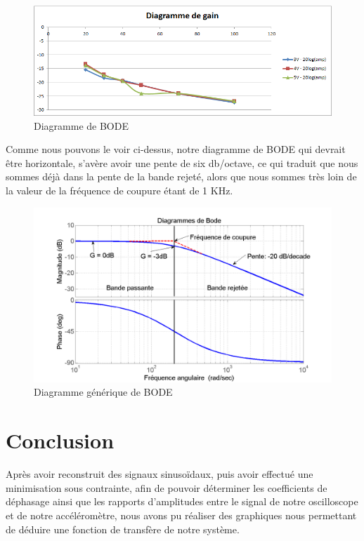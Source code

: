 \documentclass[french,a4paper,12pt]{report}
\begin{document}
	\begin{figure}[!ht]
    \center
  	\includegraphics[width=15cm]{baud.png}
    \caption{Diagramme de BODE}
	\end{figure}	
	
	Comme nous pouvons le voir ci-dessus, notre diagramme de BODE qui devrait être horizontale, s'avère avoir une pente de six db/octave, ce qui traduit que nous sommes déjà dans la pente de la bande rejeté, alors que nous sommes très loin de la valeur de la fréquence de coupure étant de 1 KHz.
	
	\begin{figure}[!ht]
    \center
  	\includegraphics[width=15cm]{bode.png}
    \caption{Diagramme générique de BODE}
	\end{figure}
	
\newpage	
	
		\section{Conclusion}
			Après avoir reconstruit des signaux sinusoïdaux, puis avoir effectué une minimisation sous contrainte, afin de pouvoir déterminer les coefficients de déphasage ainsi que les rapports d'amplitudes entre le signal de notre oscilloscope et de notre accéléromètre, nous avons pu réaliser des graphiques nous permettant de déduire une fonction de transfère de notre système.
			
\end{document}
